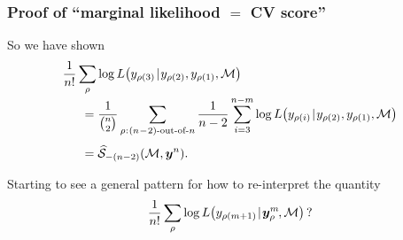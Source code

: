 \documentclass[18pt]{beamer}
\newcommand{\given}{\thinnerspace | \thinnerspace}
\newcommand{\spacedColon}{\mkern .5mu : \mkern 1mu}
\newcommand{\thinnerspace}{\mskip.5\thinmuskip}
\newcommand{\negthinnerspace}{\mskip-.5\thinmuskip}
\newcommand{\likelihood}{L}
\newcommand{\by}{\bm{y}}
\newcommand{\score}{\mathcal{S}}
\newcommand{\modelSymbol}{\mathcal{M}}
\newcommand{\permutation}{\rho}
\newcommand{\trainingSize}{m}
\newcommand{\testSampleIndex}{i}
\begin{document}
\begin{frame}
\frametitle{Proof of ``marginal likelihood $=$ {\large CV} score''}
So we have shown
\begin{equation*}
\setlength{\jot}{0\baselineskip}
\begin{aligned}
&\frac{1}{n!} \sum_\permutation \log \likelihood\!\left(y_{\permutation(3)} \given y_{\permutation(2)}, y_{\permutation(1)}, \modelSymbol \right) \\
	&\hspace*{1.5em}= \frac{1}{{n \choose 2}} \sum_{\permutation \spacedColon \text{$(n\!-\!2)$-out-of-$n$}}
		\frac{1}{n - 2} \sum_{\testSampleIndex = 3}^{n - \trainingSize} \log \likelihood\!\left(y_{\permutation(\testSampleIndex)} \given y_{\permutation(2)}, y_{\permutation(1)}, \modelSymbol \right) \\[.5\baselineskip]
	&\hspace*{1.5em}= \widehat{\score}_{-(n - 2)}(\modelSymbol, \by^n).
\end{aligned}
\end{equation*}

\pause
Starting to see a general pattern for how to re-interpret the quantity
$$\frac{1}{n!} \sum_\permutation  \log \likelihood\!\left(y_{\permutation(\trainingSize + 1)} \given \by_\permutation^\trainingSize\negthinnerspace, \modelSymbol \right) \text{?}$$
\end{frame}
\end{document}
